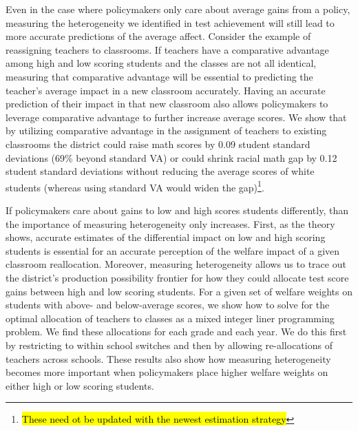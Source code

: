 \documentclass[12pt]{article}
\theoremstyle{definition}
\theoremstyle{definition}
\theoremstyle{definition}
\theoremstyle{definition}
\begin{document}
     Even in the case where policymakers only care about average gains from a policy, measuring the heterogeneity we identified in test achievement will still lead to more accurate predictions of the average affect. Consider the example of reassigning teachers to classrooms. If teachers have a comparative advantage among high and low scoring students and the classes are not all identical, measuring that comparative advantage will be essential to predicting the teacher's average impact in a new classroom accurately. Having an accurate prediction of their impact in that new classroom also allows policymakers to leverage comparative advantage to further increase average scores. We show that by utilizing comparative advantage in the assignment of teachers to existing classrooms the district could raise math scores by 0.09 student standard deviations (69\% beyond standard VA) or could shrink racial math gap by 0.12 student standard deviations without reducing the average scores of white students (whereas using standard VA would widen the gap)\footnote{\hl{These need ot be updated with the newest estimation strategy}}.

     If policymakers care about gains to low and high scores students differently, than the importance of measuring heterogeneity only increases. First, as the theory shows, accurate estimates of the differential impact on low and high scoring students is essential for an accurate perception of the welfare impact of a given classroom reallocation. Moreover, measuring heterogeneity allows us to trace out the district's production possibility frontier for how they could allocate test score gains between high and low scoring students. For a given set of welfare weights on students with above- and below-average scores, we show how to solve for the optimal allocation of teachers to classes as a mixed integer liner programming problem. We find these allocations for each grade and each year. We do this first by restricting to within school switches and then by allowing re-allocations of teachers across schools. These results also show how measuring heterogeneity becomes more important when policymakers place higher welfare weights on either high or low scoring students. 
    
\end{document}
